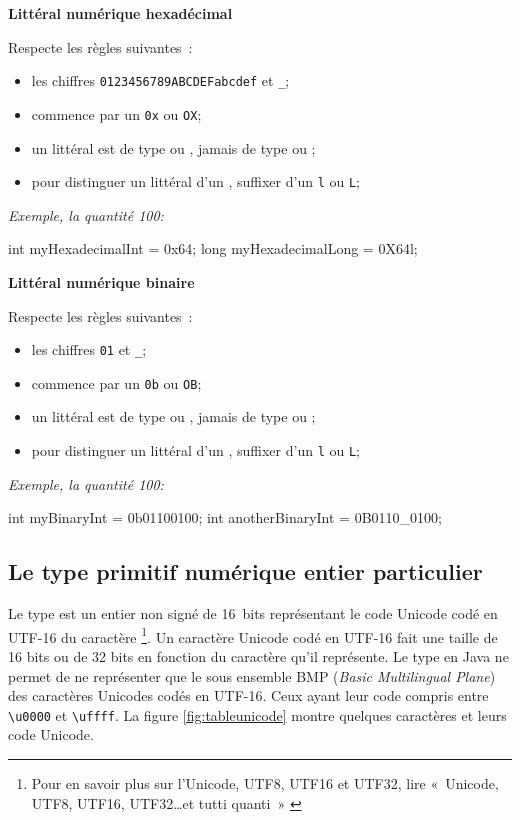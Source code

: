 \textbf{Littéral numérique hexadécimal}

Respecte les règles suivantes~:

\begin{itemize}
	\item les chiffres \texttt{0123456789ABCDEFabcdef} et \texttt{\_};
	\item commence par un \texttt{0x} ou \texttt{OX};
	\item un littéral est de type  ou , jamais de type 
		 ou ;
	\item pour distinguer un littéral  d'un , suffixer 
		d'un \texttt{l} ou \texttt{L};
\end{itemize}

\textit{Exemple, la quantité 100: }
\begin{java}
	int myHexadecimalInt = 0x64;
	long myHexadecimalLong = 0X64l;
\end{java}

\textbf{Littéral numérique binaire}

Respecte les règles suivantes~:

\begin{itemize}
	\item les chiffres \texttt{01} et \texttt{\_};
	\item commence par un \texttt{0b} ou \texttt{OB};
	\item un littéral est de type  ou , jamais de type 
		 ou ;
	\item pour distinguer un littéral  d'un , suffixer 
		d'un \texttt{l} ou \texttt{L};
\end{itemize}

\textit{Exemple, la quantité 100: } 
\begin{java}
	int myBinaryInt = 0b01100100;
	int anotherBinaryInt = 0B0110\_0100;
\end{java}

\subsection{Le type primitif numérique entier particulier }

Le type  est un entier non signé de 16~bits représentant le code 
Unicode codé en UTF-16 du caractère
	\footnote{%
		Pour en savoir plus sur l'Unicode, UTF8, UTF16 et UTF32, lire
		«~Unicode, UTF8, UTF16, UTF32\ldots et tutti quanti~» \cite{pbt-unicode}
	}. 
Un caractère Unicode codé en UTF-16 fait une taille de 16 bits ou de 32 bits en
fonction du caractère qu'il représente. Le type  en Java ne permet de
ne représenter que le sous ensemble BMP (\textit{Basic Multilingual Plane}) des
caractères Unicodes codés en UTF-16. Ceux ayant leur code compris entre
\texttt{\textbackslash u0000} et \texttt{\textbackslash uffff}. La figure 
\vref{fig:tableunicode} montre quelques caractères et leurs code Unicode. 

